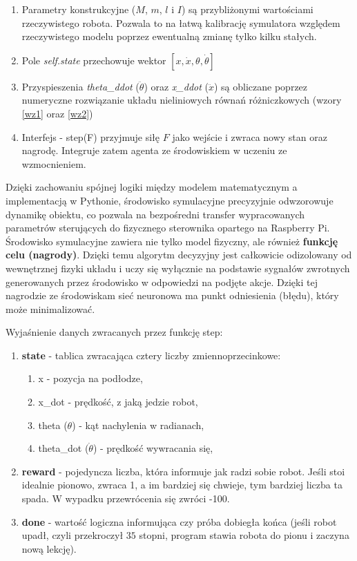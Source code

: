 \documentclass[12pt,twoside]{article}
\begin{document}
\begin{enumerate}
    \item Parametry konstrukcyjne ($M$, $m$, $l$ i $I$) są przybliżonymi wartościami rzeczywistego robota. Pozwala to na łatwą kalibrację symulatora względem rzeczywistego modelu poprzez ewentualną zmianę tylko kilku stałych. 
    \item Pole \textit{self.state} przechowuje wektor $[x, \dot{x}, \theta, \dot{\theta}]$
    \item Przyspieszenia \textit{theta\_ddot} ($\ddot{\theta}$) oraz \textit{x\_ddot} ($\ddot{x}$) są obliczane poprzez numeryczne rozwiązanie układu nieliniowych równań różniczkowych (wzory \ref{wz1} oraz \ref{wz2})
    \item Interfejs - step(F) przyjmuje siłę $F$ jako wejście i zwraca nowy stan oraz nagrodę. Integruje zatem agenta ze środowiskiem w uczeniu ze wzmocnieniem.
\end{enumerate}
Dzięki zachowaniu spójnej logiki między modelem matematycznym a implementacją w Pythonie, środowisko symulacyjne precyzyjnie odwzorowuje dynamikę obiektu, co pozwala na bezpośredni transfer wypracowanych parametrów sterujących do fizycznego sterownika opartego na Raspberry Pi. Środowisko symulacyjne zawiera nie tylko model fizyczny, ale również \textbf{funkcję celu (nagrody)}. Dzięki temu algorytm decyzyjny jest całkowicie odizolowany od wewnętrznej fizyki układu i uczy się wyłącznie na podstawie sygnałów zwrotnych generowanych przez środowisko w odpowiedzi na podjęte akcje. Dzięki tej nagrodzie ze środowiskam sieć neuronowa ma punkt odniesienia (błędu), który może minimalizować.

Wyjaśnienie danych zwracanych przez funkcję step:
\begin{enumerate}
    \item \textbf{state} - tablica zwracająca cztery liczby zmiennoprzecinkowe:
    \begin{enumerate}
        \item x - pozycja na podłodze,
        \item x\_dot - prędkość, z jaką jedzie robot,
        \item theta ($\theta$) - kąt nachylenia w radianach,
        \item theta\_dot ($\dot{\theta}$) - prędkość wywracania się,
    \end{enumerate}
    \item \textbf{reward} - pojedyncza liczba, która informuje jak radzi sobie robot. Jeśli stoi idealnie pionowo, zwraca 1, a im bardziej się chwieje, tym bardziej liczba ta spada. W wypadku przewrócenia się zwróci -100.
    \item \textbf{done} - wartość logiczna informująca czy próba dobiegła końca (jeśli robot upadł, czyli przekroczył $35$ stopni, program stawia robota do pionu i zaczyna nową lekcję).
\end{enumerate}
\end{document}
